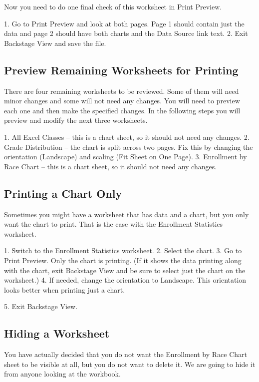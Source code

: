 Now you need to do one final check of this worksheet in Print Preview.

1. Go to Print Preview and look at both pages. Page 1 should contain just the data and page 2
should have both charts and the Data Source link text.
2. Exit Backstage View and save the file.

\subsection{Preview Remaining Worksheets for Printing}

There are four remaining worksheets to be reviewed. Some of them will need minor changes and
some will not need any changes. You will need to preview each one and then make the specified
changes. In the following steps you will preview and modify the next three worksheets.

1. All Excel Classes – this is a chart sheet, so it should not need any changes.
2. Grade Distribution – the chart is split across two pages. Fix this by changing the orientation
(Landscape) and scaling (Fit Sheet on One Page).
3. Enrollment by Race Chart – this is a chart sheet, so it should not need any changes.

\subsection{Printing a Chart Only}

Sometimes you might have a worksheet that has data and a chart, but you only want the chart to print.
That is the case with the Enrollment Statistics worksheet.

1. Switch to the Enrollment Statistics worksheet.
2. Select the chart.
3. Go to Print Preview. Only the chart is printing. (If it shows the data printing along with the chart,
exit Backstage View and be sure to select just the chart on the worksheet.)
4. If needed, change the orientation to Landscape. This orientation looks better when printing just
a chart.

5. Exit Backstage View.

\subsection{Hiding a Worksheet}

You have actually decided that you do not want the Enrollment by Race Chart sheet to be visible at
all, but you do not want to delete it. We are going to hide it from anyone looking at the workbook.

